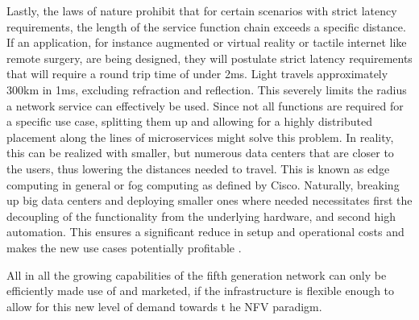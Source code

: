 Lastly, the laws of nature prohibit that for certain scenarios with strict latency requirements, the length of the service function chain exceeds a specific distance. If an application, for instance augmented or virtual reality or tactile internet like remote surgery, are being designed, they will postulate strict latency requirements that will require a round trip time of under 2ms. Light travels approximately 300km in 1ms, excluding refraction and reflection.  This severely limits the radius a network service can effectively be used. Since not all functions are required for a specific use case, splitting them up and allowing for a highly distributed placement along the lines of microservices might solve this problem. In reality, this can be realized with smaller, but numerous data centers that are closer to the users, thus lowering the distances needed to travel. This is known as edge computing in general or fog computing as defined by Cisco. Naturally, breaking up big data centers and deploying smaller ones where needed necessitates first the decoupling of the functionality from the underlying hardware, and second high automation. This ensures a significant reduce in setup and operational costs and makes the new use cases potentially profitable \cite{ordonez2017network} \cite{nfv5g} \cite{alexgalis2018multi} \cite{alexgalis2017analysis} \cite{cn5gvnf} \cite{de2019network} \cite{abdelwahab2016network} \cite{condoluci2018softwarization} \cite{nfv_wp} \cite{nfv_etsi}. 

All in all the growing capabilities of the fifth generation network can only be efficiently made use of and marketed, if the infrastructure is flexible enough to allow for this new level of demand towards t he NFV paradigm. 

